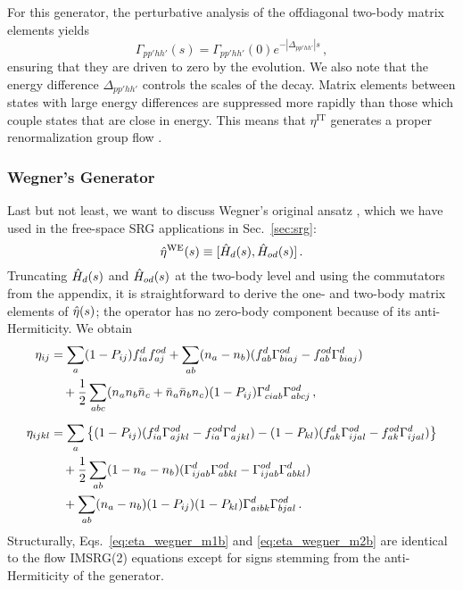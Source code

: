 For this generator, the perturbative analysis of the offdiagonal 
two-body matrix elements yields
\begin{equation}
  \Gamma_{pp'hh'}(s) = \Gamma_{pp'hh'}(0) e^{-|\Delta_{pp'hh'}|s}\,,
\end{equation}
ensuring that they are driven to zero by the evolution. We also
note that the energy difference $\Delta_{pp'hh'}$ controls
the scales of the decay. Matrix elements between states with large 
energy differences are suppressed more rapidly than those which
couple states that are close in energy. This means that $\eta^\text{IT}$ 
generates a proper renormalization group flow \cite{Kehrein:2006kx,Hergert:2016jk}.


%
%
\subsubsection{\label{sec:imsrg_generators_wegner}Wegner's Generator}
Last but not least, we want to discuss Wegner's original ansatz 
\cite{Wegner:1994dk}, which we have used in the free-space SRG applications 
in Sec.~\ref{sec:srg}:
\begin{equation}\label{eq:eta_wegner}
  \etaO^\text{WE}(s) \equiv \comm{\HO_d(s)}{\HO_{od}(s)}\,.
\end{equation}
Truncating $\hat{H}_d(s)$ and $\hat{H}_{od}(s)$ at the two-body level and using
the commutators from the appendix, it is straightforward to derive the 
one- and two-body matrix elements of $\hat{\eta}(s)$; the operator has no
zero-body component because of its anti-Hermiticity. We obtain
\begin{align}
  \eta_{ij} &= 
  \sum_{a}(1-P_{ij})f^d_{ia}f^{od}_{aj} +\sum_{ab}(n_a-n_b)(f^d_{ab}\Gamma^{od}_{biaj}-f^{od}_{ab}\Gamma^d_{biaj}) \notag\\ 
  &\quad +\frac{1}{2} \sum_{abc}(n_an_b\bar{n}_c+\bar{n}_a\bar{n}_bn_c) (1-P_{ij})\Gamma^d_{ciab}\Gamma^{od}_{abcj}
  \label{eq:eta_wegner_m1b}\,,\\[5pt]
  \eta_{ijkl}&= 
  \sum_{a}\left\{ 
    (1-P_{ij})(f^d_{ia}\Gamma^{od}_{ajkl}-f^{od}_{ia}\Gamma^{d}_{ajkl} )
    -(1-P_{kl})(f^{d}_{ak}\Gamma^{od}_{ijal}-f^{od}_{ak}\Gamma^d_{ijal} )
    \right\}\notag \\
  &\quad+ \frac{1}{2}\sum_{ab}(1-n_a-n_b)(\Gamma^d_{ijab}\Gamma^{od}_{abkl}-\Gamma^{od}_{ijab}\Gamma^d_{abkl})\notag\\
  &\quad+ \sum_{ab}(n_a-n_b) (1-P_{ij})(1-P_{kl})\Gamma^{d}_{aibk}\Gamma^{od}_{bjal}
    \label{eq:eta_wegner_m2b}\,.
\end{align}
Structurally, Eqs.~\eqref{eq:eta_wegner_m1b} and \eqref{eq:eta_wegner_m2b} 
are identical to the flow IMSRG(2) equations except for signs stemming from 
the anti-Hermiticity of the generator. 

